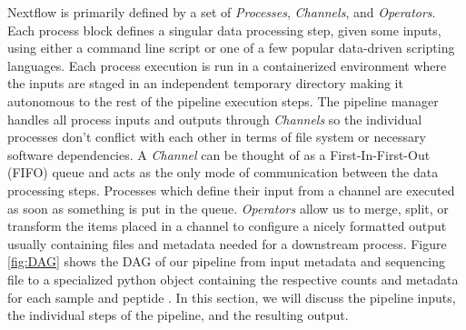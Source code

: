 \documentclass{article}
\begin{document}
Nextflow is primarily defined by a set of \textit{Processes}, \textit{Channels}, and \textit{Operators}.
Each process block defines a singular data processing step, given some inputs, using either a command line script or one of a few popular data-driven scripting languages.
Each process execution is run in a containerized environment where the inputs are staged in an independent temporary directory making it autonomous to the rest of the pipeline execution steps.
The pipeline manager handles all process inputs and outputs through \textit{Channels} so the individual processes don't conflict with each other in terms of file system or necessary software dependencies.
A \textit{Channel} can be thought of as a First-In-First-Out (FIFO) queue and acts as the only mode of communication between the data processing steps.
Processes which define their input from a channel are executed as soon as something is put in the queue.
\textit{Operators} allow us to merge, split, or transform the items placed in a channel to configure a nicely formatted output usually containing files and metadata
needed for a downstream process.
Figure \ref{fig:DAG} shows the DAG of our pipeline from input metadata and sequencing file to a specialized python object containing
the respective counts and metadata for each sample and peptide \cite{van1995python}.
In this section, we will discuss the pipeline inputs, the individual steps of the pipeline, and the resulting output.
\end{document}
